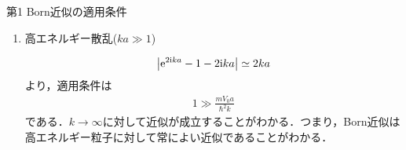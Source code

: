 \documentclass{report}
\begin{document}
\begin{myex}{第1 Born近似の適用条件}{}
\begin{enumerate}
      \item 高エネルギー散乱($ka \gg 1$)\par
        \begin{align}
          \abs{\mathrm{e}^{2\mathrm{i} ka} - 1 - 2\mathrm{i} ka} \simeq 2ka
        \end{align}
        より，適用条件は
        \begin{align}
          1 \gg \frac{mV_0 a}{\hbar^2 k}
        \end{align}
        である．$k\to\infty$に対して近似が成立することがわかる．つまり，Born近似は高エネルギー粒子に対して常によい近似であることがわかる．
    \end{enumerate}
  \end{myex}
\end{document}
